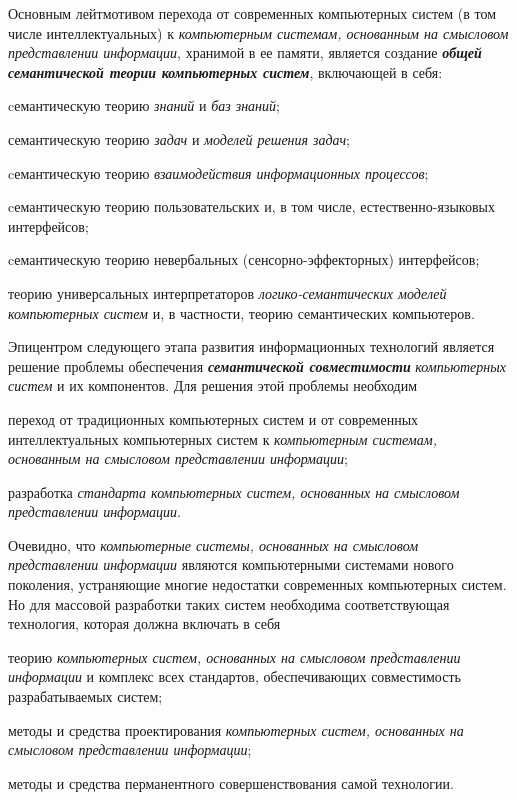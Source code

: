 \begin{SCn}
\begin{scnsubstruct}
{			Основным лейтмотивом перехода от современных компьютерных систем (в том числе интеллектуальных) к
			\textit{компьютерным системам, основанным на смысловом представлении
				информации}, хранимой в ее памяти, является создание \textbf{\textit{общей
					семантической теории компьютерных систем}}, включающей в себя:
			\begin{scnitemize}
				\item cемантическую теорию \textit{знаний} и \textit{баз знаний};
				\item семантическую теорию \textit{задач} и \textit{моделей решения
					задач};
				\item cемантическую теорию \textit{взаимодействия информационных
					процессов};
				\item cемантическую теорию пользовательских и, в том числе,
				естественно-языковых интерфейсов;
				\item cемантическую теорию невербальных (сенсорно-эффекторных)
				интерфейсов;
				\item теорию универсальных интерпретаторов \textit{логико-семантических
					моделей компьютерных систем} и, в частности, теорию семантических компьютеров.
			\end{scnitemize}
			Эпицентром следующего этапа развития информационных технологий является
			решение проблемы обеспечения \textbf{\textit{семантической совместимости}}
			\textit{компьютерных систем} и их компонентов. Для решения этой проблемы
			необходим
			\begin{scnitemize}
				\item переход от традиционных компьютерных систем и от современных
				интеллектуальных компьютерных систем к \textit{компьютерным системам,
					основанным на смысловом представлении информации};
				\item разработка \textit{стандарта компьютерных систем, основанных на
					смысловом представлении информации}.
			\end{scnitemize}
			Очевидно, что \textit{компьютерные системы, основанных на смысловом
				представлении информации} являются компьютерными системами нового поколения,
			устраняющие многие недостатки современных компьютерных систем. Но для массовой
			разработки таких систем необходима соответствующая технология, которая должна
			включать в себя
			\begin{scnitemize}
				\item теорию \textit{компьютерных систем, основанных на смысловом
					представлении информации} и комплекс всех стандартов, обеспечивающих
				совместимость разрабатываемых систем;
				\item методы и средства проектирования \textit{компьютерных систем,
					основанных на смысловом представлении информации};
				\item методы и средства перманентного совершенствования самой
				технологии.
			\end{scnitemize}}


\end{scnsubstruct}
\end{SCn}
